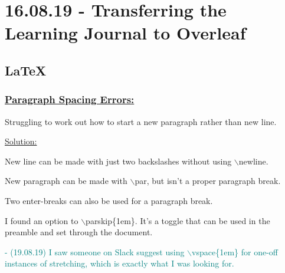 \documentclass[12pt]{article}
\begin{document}

\newpage\section{16.08.19 - Transferring the Learning Journal to Overleaf}

\subsection{LaTeX}
\subsubsection{\underline{Paragraph Spacing Errors:}}\label{error:er6}
\begin{addmargin}[1cm]{0cm}
Struggling to work out how to start a new paragraph rather than new line. 

\underline{Solution:}

New line can be made with just two backslashes without using $\backslash$newline.

New paragraph can be made with $\backslash$par, but isn't a proper paragraph break.

Two enter-breaks can also be used for a paragraph break.

I found an option to $\backslash$parskip\{1em\}. It's a toggle that can be used in the preamble and set through the document.

\textcolor{teal}{- (19.08.19) I saw someone on Slack suggest using $\backslash$vspace\{1em\} for one-off instances of stretching, which is exactly what I was looking for.}


\end{addmargin}
\end{document}
